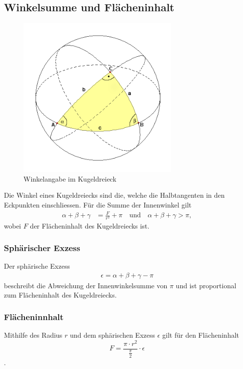 \subsection{Winkelsumme und Flächeninhalt}
\begin{figure}
	
	\begin{center}
		\includegraphics[width=8cm]{papers/nav/bilder/kugel2.png}
		\caption[Winkelangabe im Kugeldreieck]{Winkelangabe im Kugeldreieck}
	\end{center}	
\end{figure}


Die Winkel eines Kugeldreiecks sind die, welche die Halbtangenten in den Eckpunkten einschliessen. 
Für die Summe der Innenwinkel gilt
\begin{align}
	\alpha+\beta+\gamma &= \frac{F}{r^2} + \pi \quad \text{und} \quad \alpha+\beta+\gamma > \pi, \nonumber
\end{align}
wobei $F$ der Flächeninhalt des Kugeldreiecks ist.
\subsubsection{Sphärischer Exzess}
Der sphärische Exzess
\begin{align}
	\epsilon = \alpha+\beta+\gamma - \pi \nonumber
\end{align}  
beschreibt die Abweichung der Innenwinkelsumme von $\pi$ und ist proportional zum Flächeninhalt des Kugeldreiecks.

\subsubsection{Flächeninnhalt}
Mithilfe des Radius $r$ und dem sphärischen Exzess $\epsilon$ gilt für den Flächeninhalt 
\[ F=\frac{\pi \cdot r^2}{\frac{\pi}{2}} \cdot \epsilon\].

